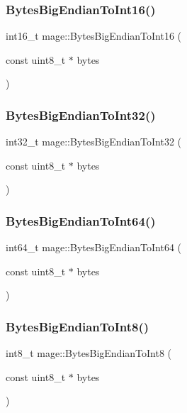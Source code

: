 \subsubsection{\texorpdfstring{Bytes\+Big\+Endian\+To\+Int16()}{BytesBigEndianToInt16()}}
{\footnotesize\ttfamily int16\+\_\+t mage\+::\+Bytes\+Big\+Endian\+To\+Int16 (\begin{DoxyParamCaption}\item[{const uint8\+\_\+t $\ast$}]{bytes }\end{DoxyParamCaption})}

\hypertarget{namespacemage_ae98f64655a7d791c6c6efba16ce6b8e8}{}\label{namespacemage_ae98f64655a7d791c6c6efba16ce6b8e8} 
\subsubsection{\texorpdfstring{Bytes\+Big\+Endian\+To\+Int32()}{BytesBigEndianToInt32()}}
{\footnotesize\ttfamily int32\+\_\+t mage\+::\+Bytes\+Big\+Endian\+To\+Int32 (\begin{DoxyParamCaption}\item[{const uint8\+\_\+t $\ast$}]{bytes }\end{DoxyParamCaption})}

\hypertarget{namespacemage_a52f6dec57a9c644e912a88f8cfabe199}{}\label{namespacemage_a52f6dec57a9c644e912a88f8cfabe199} 
\subsubsection{\texorpdfstring{Bytes\+Big\+Endian\+To\+Int64()}{BytesBigEndianToInt64()}}
{\footnotesize\ttfamily int64\+\_\+t mage\+::\+Bytes\+Big\+Endian\+To\+Int64 (\begin{DoxyParamCaption}\item[{const uint8\+\_\+t $\ast$}]{bytes }\end{DoxyParamCaption})}

\hypertarget{namespacemage_a7dd5ebfc406cb1d6a8a403a8db29af36}{}\label{namespacemage_a7dd5ebfc406cb1d6a8a403a8db29af36} 
\subsubsection{\texorpdfstring{Bytes\+Big\+Endian\+To\+Int8()}{BytesBigEndianToInt8()}}
{\footnotesize\ttfamily int8\+\_\+t mage\+::\+Bytes\+Big\+Endian\+To\+Int8 (\begin{DoxyParamCaption}\item[{const uint8\+\_\+t $\ast$}]{bytes }\end{DoxyParamCaption})}


